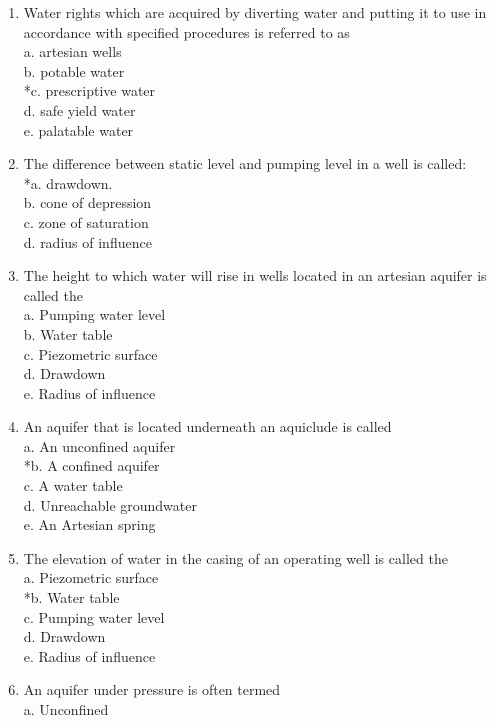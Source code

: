 
\begin{enumerate}
\item Water rights which are acquired by diverting water and putting it to use in accordance with specified procedures is referred to as\\
a. artesian wells\\
b. potable water\\
*c. prescriptive water\\
d. safe yield water\\
e. palatable water\\
\item The difference between static level and pumping level in a well is called:\\
*a. drawdown.\\
b. cone of depression\\
c. zone of saturation\\
d. radius of influence\\
\item The height to which water will rise in wells located in an artesian aquifer is called the\\
a. Pumping water level\\
b. Water table\\
c. Piezometric surface\\
d. Drawdown\\
e. Radius of influence\\
\item An aquifer that is located underneath an aquiclude is called\\
a. An unconfined aquifer\\
*b. A confined aquifer\\
c. A water table\\
d. Unreachable groundwater\\
e. An Artesian spring\\
\item The elevation of water in the casing of an operating well is called the\\
a. Piezometric surface\\
*b. Water table\\
c. Pumping water level\\
d. Drawdown\\
e. Radius of influence\\
\item An aquifer under pressure is often termed\\
a. Unconfined\\

\end{enumerate}
